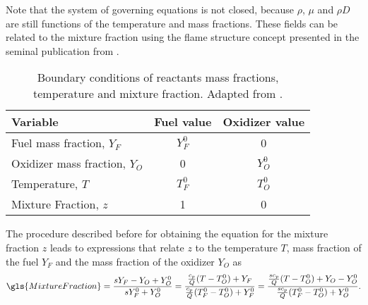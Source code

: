 Note that the system of governing equations is not closed, because $\rho$, $\mu$ and $\rho D$ are still functions of the temperature and mass fractions. These fields can be related to the mixture fraction using the flame structure concept presented in the seminal publication from \textcite{burkeDiffusionFlames1928}. 

\begin{table}[]
	\centering
	\begin{tabular}{lcc}
		\hline
		Variable                      & \multicolumn{1}{l}{Fuel value} & \multicolumn{1}{l}{Oxidizer value} \\ \hline
		Fuel mass fraction, $Y_F$     & $Y_F^0$                              & 0                                        \\
		Oxidizer mass fraction, $Y_O$ & 0                                    & $Y_O^0$                                  \\
		Temperature, $T$              & $T_F^0$                              & $T_O^0$                                  \\
		Mixture Fraction, $z$         & 1                                    & 0                                        \\ \hline
	\end{tabular}
	\caption[Boundary conditions of reactants mass fractions, temperature and mixture fraction.]{Boundary conditions of reactants mass fractions, temperature and mixture fraction. Adapted from \textcite{poinsotTheoreticalNumericalCombustion2011}. }
	\label{tab:BCMixtureFraction}
\end{table}

The procedure described before for obtaining the equation for the mixture fraction $z$ leads to expressions that relate $z$ to the temperature $T$, mass fraction of the fuel $Y_F$ and the mass fraction of the oxidizer $Y_O$ as
\begin{equation}
	\gls{MixtureFraction} = \frac{s Y_F -Y_O +Y_O^0}{sY_F^0+Y_O^0} = \frac{\frac{c_p}{Q}(T-T_O^0)+Y_F }{\frac{c_p}{Q}(T_F^0-T_O^0)+Y_F^0} = \frac{\frac{s c_p}{Q}(T-T_O^0)+Y_O-Y_O^0 }{\frac{sc_p}{Q}(T_F^0-T_O^0)+Y_O^0}. \label{eq:AllMFRelationships}
\end{equation}

